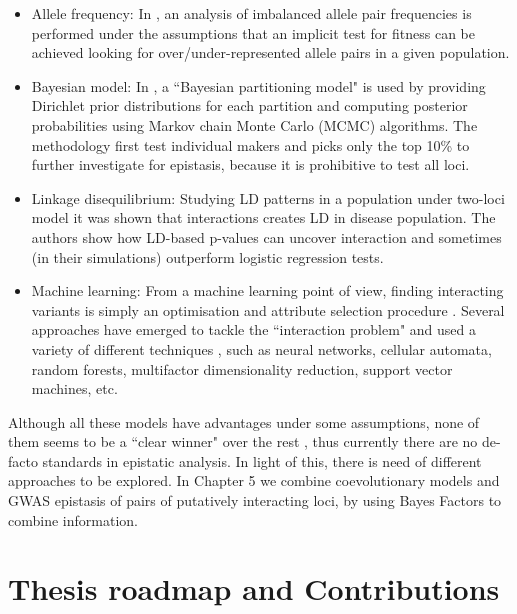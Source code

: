 \begin{itemize}

\item Allele frequency: In \cite{ackermann2012systematic}, an analysis of imbalanced allele pair frequencies is performed under the assumptions that an implicit test for fitness can be achieved looking for over/under-represented allele pairs in a given population.

\item Bayesian model: In \cite{zhang2007bayesian}, a ``Bayesian partitioning model" is used by providing Dirichlet prior distributions for each partition and computing posterior probabilities using Markov chain Monte Carlo (MCMC) algorithms.  The methodology first test individual makers and picks only the top 10\% to further investigate for epistasis, because it is prohibitive to test all loci.

\item Linkage disequilibrium: Studying LD patterns in a population under two-loci model it was shown \cite{zhao2006test} that interactions creates LD in disease population. The authors show how LD-based p-values can uncover interaction and sometimes (in their simulations) outperform logistic regression tests.

\item Machine learning: From a machine learning point of view, finding interacting variants is simply an optimisation and attribute selection procedure \cite{mckinney2006machine}. Several approaches have emerged to tackle the ``interaction problem" and used a variety of different techniques \cite{koo2013review, mckinney2006machine} , such as neural networks, cellular automata, random forests, multifactor dimensionality reduction, support vector machines, etc.

\end{itemize}

Although all these models have advantages under some assumptions, none of them seems to be a ``clear winner" over the rest \cite{cordell2009detecting}, thus currently there are no de-facto standards in epistatic analysis. In light of this, there is need of different approaches to be explored. In Chapter 5 we combine coevolutionary models and GWAS epistasis of pairs of putatively interacting loci, by using Bayes Factors to combine information. 

\section{Thesis roadmap and Contributions}

